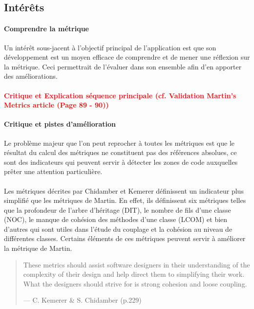 \documentclass{scrartcl}
\newcommand{\TODO}[1] {
    \noindent \paragraph{\textcolor{red}{#1}}
}
\begin{document}
\subsection{Intérêts}

    \paragraph{Comprendre la métrique}Un intérêt sous-jacent à l'objectif principal de l'application est que son développement est un moyen efficace de comprendre et de mener une réflexion sur la métrique. Ceci permettrait de l'évaluer dans son ensemble afin d'en apporter des améliorations.

    \TODO{Critique et Explication séquence principale (cf. Validation Martin's Metrics article (Page 89 - 90))}
    
    \paragraph{Critique et pistes d'amélioration}Le problème majeur que l'on peut reprocher à toutes les métriques est que le résultat du calcul des métriques ne constituent pas des références absolues, ce sont des indicateurs qui peuvent servir à détecter les zones de code auxquelles prêter une attention particulière.
    

    \paragraph{}Les métriques décrites par Chidamber et Kemerer\cite{ChidamberKemerer:1994} définissent un  indicateur plus simplifié que les métriques de Martin. En effet, ils définissent six métriques telles que la profondeur de l'arbre d'héritage (DIT), le nombre de fils d'une classe (NOC), le manque de cohésion des méthodes d'une classe (LCOM) et bien d'autres qui sont utiles dans l'étude du couplage et la cohésion au niveau de différentes classes. Certains éléments de ces métriques peuvent servir à améliorer la métrique de Martin.
    
    \begin{quote}
        These metrics should assist software designers in their understanding of the complexity of their design and help direct them to simplifying their work. What the designers should strive for is strong cohesion and loose coupling.
        \begin{flushright}--- C. Kemerer \& S. Chidamber \cite{ChidamberKemerer:1994} (p.229)\end{flushright}
    \end{quote}
    
\end{document}
